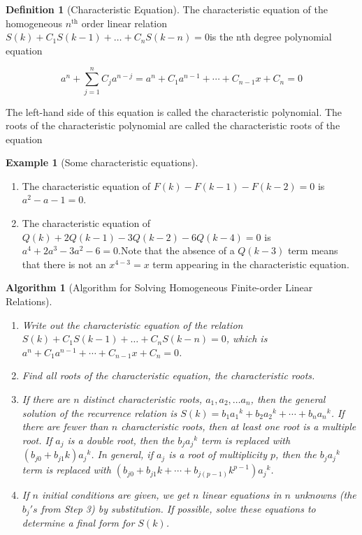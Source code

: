 \documentclass[10pt,]{book}
\theoremstyle{plain}
\newtheorem{algorithm}[theorem]{Algorithm}
\theoremstyle{definition}
\newtheorem{definition}[theorem]{Definition}
\theoremstyle{definition}
\theoremstyle{definition}
\newtheorem{example}[theorem]{Example}
\theoremstyle{definition}
\numberwithin{equation}{section}
\begin{document}
\begin{definition}[Characteristic Equation]\label{def-characteristic-equation.}
The characteristic equation of the homogeneous \(n^{\textrm{th}}\) order linear relation \(S(k) + C_1 S(k- 1) +\ldots + C_n S(k - n) =0\)is the nth degree polynomial equation

\[a^n+\sum_{j=1}^n C_j a^{n-j}=a^n+ C_1a^{n-1}+\cdots +C_{n-1}x+C_n=0\] 

The left-hand side of this equation is called the characteristic polynomial.  The roots of the characteristic polynomial are called the characteristic roots of the equation%
\end{definition}
\begin{example}[Some characteristic equations]\label{ex-some-char-equations}
\leavevmode%
\begin{enumerate}[label=\alph*]
\item\hypertarget{li-32}{}The characteristic equation of \(F(k) - F(k - 1) - F(k - 2) = 0\) is \(a^2-a-1=0\).%
\item\hypertarget{li-33}{} The characteristic equation of \(Q(k) + 2Q(k - 1) - 3Q(k - 2) - 6 Q(k- 4) = 0\) is \(a^4+ 2a^3 - 3a^2 - 6 = 0.\)Note that the absence of
a \(Q(k - 3)\) term means that there is not an \(x^{4-3}=x\) term appearing in the characteristic equation.%
\end{enumerate}
%
\end{example}
\begin{algorithm}[Algorithm for Solving Homogeneous Finite-order Linear Relations]\label{algorithm-linear-homogeneous-recurrence-relations}

\leavevmode%
\begin{enumerate}
\item\hypertarget{li-34}{}Write out the characteristic equation of the relation \(S(k) + C_1S(k - 1) +\ldots + C_n S(k - n) =0\), which is \(a^n+ C_1a^{n-1}+\cdots
+C_{n-1}x+C_n=0\).%
\item\hypertarget{li-35}{}Find all roots of the characteristic equation, the characteristic roots.%
\item\hypertarget{li-36}{} If there are \(n\) distinct characteristic roots, \(a_1, a_2, \dots a_n\), then the general solution of the recurrence relation
is \(S(k) = b_1a_1{}^k+ b_2a_2{}^k+\cdots +b_na_n{}^k\). If there are fewer than \(n\) characteristic roots, then at least one root is a multiple
root. If \(a_j\) is a double root, then the \(b_ja_j{}^k\) term is replaced with \(\left(b_{j 0}+b_{j 1}k\right)a_j{}^k\). In general, if \(a_j\)
is a root of multiplicity \(p\), then the \(b_ja_j{}^k\) term is replaced with \(\left(b_{j 0}+b_{j 1}k+\cdots +b_{j(p-1)}k^{p-1}\right)a_j{}^k\).%
\item\hypertarget{li-37}{}If \(n\) initial conditions are given, we get \(n\) linear equations in \(n\) unknowns (the \(b_j's\) from Step 3) by substitution. If possible, solve these equations to determine a final form for \(S(k)\).%
\end{enumerate}

%
\end{algorithm}
\end{document}
